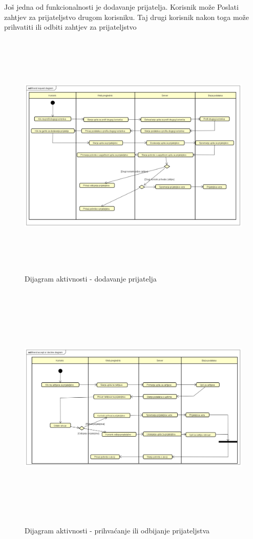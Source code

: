 		 	Još jedna od funkcionalnosti je dodavanje prijatelja. Korisnik može Poslati zahtjev za prijateljstvo drugom korisniku. Taj drugi korisnik nakon toga može prihvatiti ili odbiti zahtjev za prijateljstvo
		 	\begin{figure}[H]
		 	\includegraphics[scale=0.6, height=120mm, width=165mm]{dijagrami/activity/friend request diagram.png} %
		 	\centering
		 	\caption{Dijagram aktivnosti - dodavanje prijatelja}
		 	\label{fig:dijagrami_aktivnosti2}
			 \end{figure}
		 
		 	\begin{figure}[H]
		 	\includegraphics[scale=0.6, height=120mm, width=165mm]{dijagrami/activity/friend accept or decline diagram.png} %
		 	\centering
		 	\caption{Dijagram aktivnosti - prihvaćanje ili odbijanje prijateljstva}
		 	\label{fig:dijagrami_aktivnosti2}
		 	\end{figure}
			
